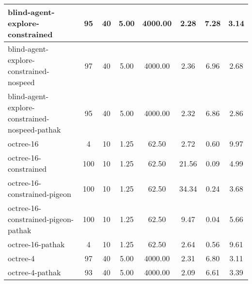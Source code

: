 \begin{sidewaystable}
\begin{longtable}{|l|c|c|c|c|c|c|c|}
        blind-agent-explore-constrained & {\cellcolor[HTML]{5DAE9D}} \color[HTML]{F1F1F1} 95 & 40 & 5.00 & {\cellcolor[HTML]{55AA99}} \color[HTML]{F1F1F1} 4000.00 & {\cellcolor[HTML]{EBF2F0}} \color[HTML]{000000} 2.28 & 7.28 & 3.14 \\ \hline
        blind-agent-explore-constrained-nospeed & {\cellcolor[HTML]{5AAC9C}} \color[HTML]{F1F1F1} 97 & 40 & 5.00 & {\cellcolor[HTML]{55AA99}} \color[HTML]{F1F1F1} 4000.00 & {\cellcolor[HTML]{EBF2F0}} \color[HTML]{000000} 2.36 & 6.96 & 2.68 \\ \hline
        blind-agent-explore-constrained-nospeed-pathak & {\cellcolor[HTML]{5DAE9D}} \color[HTML]{F1F1F1} 95 & 40 & 5.00 & {\cellcolor[HTML]{55AA99}} \color[HTML]{F1F1F1} 4000.00 & {\cellcolor[HTML]{EBF2F0}} \color[HTML]{000000} 2.32 & 6.86 & 2.86 \\ \hline
        octree-16 & {\cellcolor[HTML]{EBF2F0}} \color[HTML]{000000} 4 & 10 & 1.25 & {\cellcolor[HTML]{E9F1EF}} \color[HTML]{000000} 62.50 & {\cellcolor[HTML]{EBF2F0}} \color[HTML]{000000} 2.72 & 0.60 & 9.97 \\ \hline
        octree-16-constrained & {\cellcolor[HTML]{55AA99}} \color[HTML]{F1F1F1} 100 & 10 & 1.25 & {\cellcolor[HTML]{E9F1EF}} \color[HTML]{000000} 62.50 & {\cellcolor[HTML]{9DCDC3}} \color[HTML]{000000} 21.56 & 0.09 & 4.99 \\ \hline
        octree-16-constrained-pigeon & {\cellcolor[HTML]{55AA99}} \color[HTML]{F1F1F1} 100 & 10 & 1.25 & {\cellcolor[HTML]{E9F1EF}} \color[HTML]{000000} 62.50 & {\cellcolor[HTML]{55AA99}} \color[HTML]{F1F1F1} 34.34 & 0.24 & 3.68 \\ \hline
        octree-16-constrained-pigeon-pathak & {\cellcolor[HTML]{55AA99}} \color[HTML]{F1F1F1} 100 & 10 & 1.25 & {\cellcolor[HTML]{E9F1EF}} \color[HTML]{000000} 62.50 & {\cellcolor[HTML]{E2EEEB}} \color[HTML]{000000} 9.47 & 0.04 & 5.66 \\ \hline
        octree-16-pathak & {\cellcolor[HTML]{EBF2F0}} \color[HTML]{000000} 4 & 10 & 1.25 & {\cellcolor[HTML]{E9F1EF}} \color[HTML]{000000} 62.50 & {\cellcolor[HTML]{EBF2F0}} \color[HTML]{000000} 2.64 & 0.56 & 9.61 \\ \hline
        octree-4 & {\cellcolor[HTML]{5AAC9C}} \color[HTML]{F1F1F1} 97 & 40 & 5.00 & {\cellcolor[HTML]{55AA99}} \color[HTML]{F1F1F1} 4000.00 & {\cellcolor[HTML]{EBF2F0}} \color[HTML]{000000} 2.31 & 6.80 & 3.11 \\ \hline
        octree-4-pathak & {\cellcolor[HTML]{60AFA0}} \color[HTML]{F1F1F1} 93 & 40 & 5.00 & {\cellcolor[HTML]{55AA99}} \color[HTML]{F1F1F1} 4000.00 & {\cellcolor[HTML]{EBF2F0}} \color[HTML]{000000} 2.09 & 6.61 & 3.39 \\ \hline

\end{longtable}
\end{sidewaystable}
